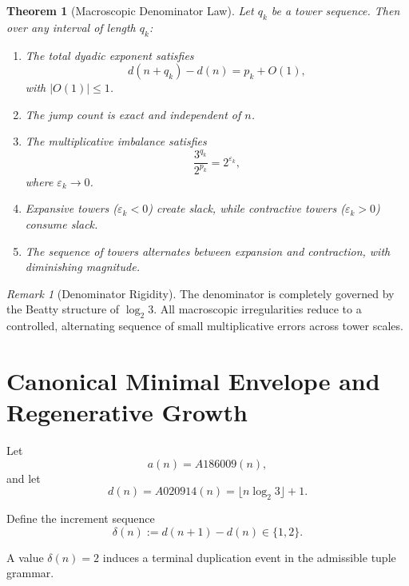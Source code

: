 \documentclass[12pt, oneside]{article}
\numberwithin{equation}{section}
\theoremstyle{definition}
\theoremstyle{plain}
\newtheorem{theorem}{Theorem}[section]
\theoremstyle{remark}
\newtheorem*{remark}{Remark}
\begin{document}

\begin{theorem}[Macroscopic Denominator Law]
\label{thm:denominator-law}
Let $q_k$ be a tower sequence.  Then over any interval of length $q_k$:
\begin{enumerate}
\item The total dyadic exponent satisfies
\[
d(n+q_k)-d(n) = p_k + O(1),
\]
with $|O(1)| \le 1$.

\item The jump count is exact and independent of $n$.

\item The multiplicative imbalance satisfies
\[
\frac{3^{q_k}}{2^{p_k}} = 2^{\varepsilon_k},
\]
where $\varepsilon_k \to 0$.

\item Expansive towers ($\varepsilon_k<0$) create slack, while
contractive towers ($\varepsilon_k>0$) consume slack.

\item The sequence of towers alternates between expansion and contraction,
with diminishing magnitude.
\end{enumerate}
\end{theorem}


\begin{remark}[Denominator Rigidity]
The denominator is completely governed by the Beatty structure of
$\log_2 3$.  All macroscopic irregularities reduce to a controlled,
alternating sequence of small multiplicative errors across tower scales.
\end{remark}


\section{Canonical Minimal Envelope and Regenerative Growth}
\label{sec:minimal-envelope}

Let
\[
a(n)=A186009(n),
\]
and let
\[
d(n)=A020914(n)=\lfloor n\log_2 3\rfloor+1.
\]

Define the increment sequence
\[
\delta(n):=d(n+1)-d(n)\in\{1,2\}.
\]

A value $\delta(n)=2$ induces a terminal duplication event in the
admissible tuple grammar.
\end{document}
